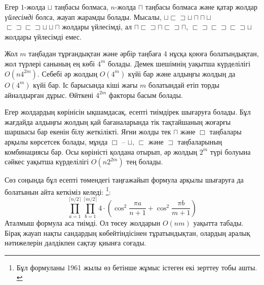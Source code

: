 Егер $1$-жолда $\sqcup$ таңбасы болмаса, 
$n$-жолда $\sqcap$ таңбасы болмаса 
және қатар жолдар \emph{үйлесімді} болса, 
жауап жарамды болады. 
Мысалы, $\sqcup \sqsubset \sqsupset \sqcup \sqcap \sqcap \sqcup$ 
$\sqsubset \sqsupset \sqsubset \sqsupset \sqcup \sqcup \sqcap$ жолдары үйлесімді, ал
$\sqcap \sqsubset \sqsupset \sqcap \sqsubset \sqsupset \sqcap$,
$\sqsubset \sqsupset \sqsubset \sqsupset \sqsubset \sqsupset \sqcup$ жолдары үйлесімді емес.

Жол $m$ таңбадан тұрғандықтан және әрбір таңбаға 4
нұсқа қоюға болатындықтан, жол түрлері санының ең көбі $4^m$ болады.
Демек шешімнің уақытша күрделілігі $O(n 4^{2m})$. Себебі
әр жолдың $O(4^m)$ күйі бар және алдыңғы жолдың да 
$O(4^m)$ күйі бар. Іс барысында 
кіші жағы $m$ болатындай етіп торды айналдырған дұрыс. 
Өйткені $4^{2m}$ факторы басым болады. 

Егер жолдардың көрінісін ықшамдасақ,
есепті тиімдірек шығаруға болады. 
Бұл жағдайда алдыңғы жолдың қай бағаналарында 
тік тақтайшаның жоғарғы шаршысы бар 
екенін білу жеткілікті.
Яғни жолды тек $\sqcap$ және $\Box$ таңбалары 
арқылы көрсетсек болады, мұнда $\Box$ -- 
$\sqcup$, $\sqsubset$ және $\sqsupset$ таңбаларының комбинациясы бар. %
Осы көріністі қолдана отырып, әр жолдың
$2^m$ түрі болуына сәйкес уақытша күрделілігі
$O(n 2^{2m})$ тең болады. 


Сөз соңында бұл есепті төмендегі таңғажайып формула арқылы шығаруға да болатынын айта кеткіміз келеді:
\footnote{Бұл формуланы 1961 жылы өз бетінше жұмыс істеген екі зерттеу тобы ашты.
\cite{kas61,tem61}}:
\[ \prod_{a=1}^{\lceil n/2 \rceil} \prod_{b=1}^{\lceil m/2 \rceil} 4 \cdot (\cos^2 \frac{\pi a}{n + 1} + \cos^2 \frac{\pi b}{m+1})\]
Аталмыш формула аса тиімді. Ол төсеу жолдарын $O(nm)$
уақытта табады. Бірақ жауап нақты сандардың көбейтіндісінен
тұратындықтан, олардың аралық нәтижелерін дәлдікпен сақтау қиынға соғады.



